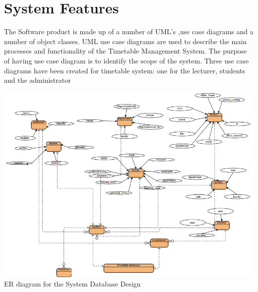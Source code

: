 \documentclass{scrreprt}
\begin{document}
\chapter{System Features}
The Software product is made up of a number of UML's ,use case diagrams and a number of object classes.
UML use case diagrams are used to describe the main processes and functionality of the
Timetable Management System. The purpose of having use case diagram is to identify
the scope of the system. Three use case diagrams have been created for timetable
system: one for the lecturer, students and the administrator
\begin{center}
\includegraphics[scale=0.6]{er.png}
ER diagram for the System Database Design
\end{center}
\end{document}
